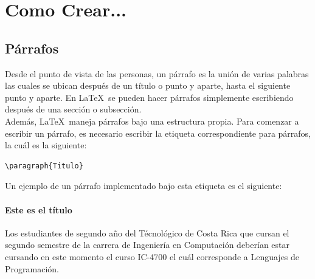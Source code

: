 \documentclass[10pt,journal,compsoc]{IEEEtran}
\begin{document}
\section{Como Crear...}


\subsection{P\'arrafos}
Desde el punto de vista de las personas, un p\'arrafo es la uni\'on de varias palabras las cuales se ubican despu\'es de un t\'itulo o punto y aparte, hasta el siguiente punto y aparte. En \LaTeX\ se pueden hacer p\'arrafos simplemente escribiendo despu\'es de una secci\'on o subsecci\'on.\\  Adem\'as, \LaTeX\ maneja p\'arrafos bajo una estructura propia. Para comenzar a escribir un p\'arrafo, es necesario escribir la etiqueta correspondiente para p\'arrafos, la cu\'al es la siguiente: 
\begin{lstlisting}
\paragraph{Titulo} 
\end{lstlisting}
Un ejemplo de un p\'arrafo implementado bajo esta etiqueta es el siguiente:
\paragraph{Este es el t\'itulo} 
Los estudiantes de segundo a\~no del T\'ecnol\'ogico de Costa Rica que cursan el segundo semestre de la carrera de Ingenier\'ia en Computaci\'on deber\'ian estar cursando en este momento el curso IC-4700 el cu\'al corresponde a Lenguajes de Programaci\'on.
\end{document}

